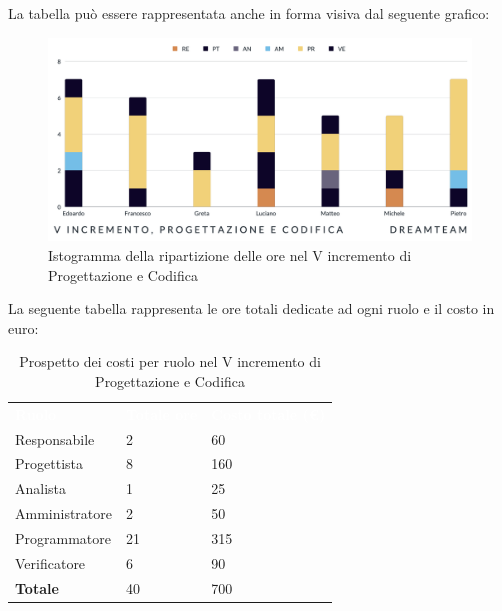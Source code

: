 La tabella può essere rappresentata anche in forma visiva dal seguente grafico:
\begin{figure}[H]
\centering
\includegraphics[scale=0.55]{Sezioni/SezioniPreventivo/grafici/Preventivo_progettazione_V.png}
\caption{Istogramma della ripartizione delle ore nel V incremento di Progettazione e Codifica}
\end{figure}

La seguente tabella rappresenta le ore totali dedicate ad ogni ruolo e il costo in euro:

\begin{table}[H]
\begin{center}
\renewcommand{\arraystretch}{1.5}
\begin{tabular}{ m{}<{\centering}  m{}<{\centering} m{}<{\centering}}
	\rowcolor{darkblue}
	\textcolor{white}{\textbf{Ruolo}}&\textcolor{white}{\textbf{Totale ore}}&\textcolor{white}{\textbf{Costo totale (\euro)}}\\ 

	Responsabile  & 2 & 60 \\	
	
	Progettista & 8 & 160 \\
	
	Analista & 1 & 25 \\

	Amministratore & 2 & 50 \\
	
	Programmatore & 21 & 315 \\
	
	Verificatore & 6 & 90 \\
	
	\textbf{Totale} & 40 & 700 \\
	
\end{tabular}
\caption{Prospetto dei costi per ruolo nel V incremento di Progettazione e Codifica}
\end{center}
\end{table}

